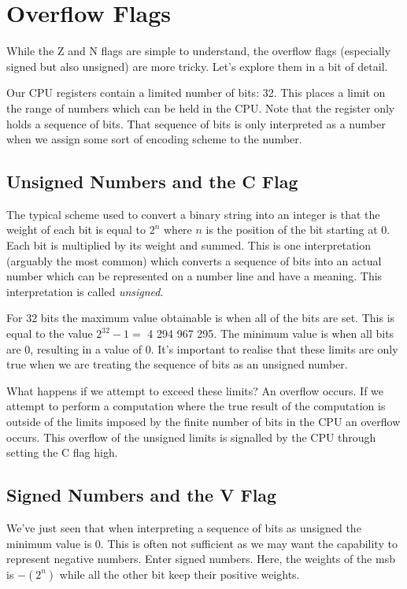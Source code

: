 \section{Overflow Flags}
While the Z and N flags are simple to understand, the overflow flags (especially signed but also unsigned) are more tricky. Let's explore them in a bit of detail. 

Our CPU registers contain a limited number of bits: 32. This places a limit on the range of numbers which can be held in the CPU. Note that the register only holds a sequence of bits. That sequence of bits is only interpreted as a number when we assign some sort of encoding scheme to the number. 

\subsection{Unsigned Numbers and the C Flag}
The typical scheme used to convert a binary string into an integer is that the weight of each bit is equal to $2^{n}$ where $n$ is the position of the bit starting at 0. Each bit is multiplied by its weight and summed. This is one interpretation (arguably the most common) which converts a sequence of bits into an actual number which can be represented on a number line and have a meaning. This interpretation is called \emph{unsigned}.

For 32 bits the maximum value obtainable is when all of the bits are set. This is equal to the value $2^{32} - 1 = $ 4 294 967 295. The minimum value is when all bits are 0, resulting in a value of 0. It's important to realise that these limits are only true when we are treating the sequence of bits as an unsigned number. 

What happens if we attempt to exceed these limits? An overflow occurs. If we attempt to perform a computation where the true result of the computation is outside of the limits imposed by the finite number of bits in the CPU an overflow occurs. This overflow of the unsigned limits is signalled by the CPU through setting the C flag high.

\subsection{Signed Numbers and the V Flag}
We've just seen that when interpreting a sequence of bits as unsigned the minimum value is 0. This is often not sufficient as we may want the capability to represent negative numbers. Enter signed numbers. Here, the weights of the msb is $-(2^{n})$ while all the other bit keep their positive weights. 

